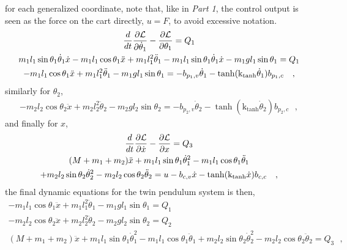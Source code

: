 for each generalized coordinate, note that, like in \textit{Part 1}, the control output is seen as the force on the cart directly, $u = F$, to avoid excessive notation.
\begin{gather}
\frac{d}{dt}  \frac{\partial \cal{L}}{\partial \dot{\theta}_1} - \frac{\partial \cal{L}}{\partial \theta_1}  = Q_1 \\
m_1 l_1 \sin \theta_1 \dot{\theta}_1 \dot{x} - m_1 l_1 \cos \theta_1 \ddot{x} + m_1 l_1^2 \ddot{\theta}_1 - m_1 l_1 \sin \theta_1 \dot{\theta}_1 \dot{x} - m_1 g l_1 \sin \theta_1 = Q_1  \\
- m_1 l_1 \cos \theta_1 \ddot{x} + m_1 l_1^2 \ddot{\theta}_1 - m_1 g l_1 \sin \theta_1 = -b_{p_1,v} \dot{\theta}_1 - \tanh(\text{k}_\text{tanh}\dot{\theta}_1) b_{p_1,c}  \ \ \ ,
\label{eq:theta1Dynamics}
\end{gather}
similarly for $\theta_2$,
\begin{gather}
- m_2 l_2 \cos \theta_2 \ddot{x} + m_2 l_2^2 \ddot{\theta}_2 - m_2 g l_2 \sin \theta_2 = -b_{p_2,v} \dot{\theta}_2 - \tanh(\text{k}_\text{tanh}\dot{\theta}_2) b_{p_2,c}  \ \ \ ,
\label{eq:theta2Dynamics}
\end{gather}
and finally for $x$,
\begin{gather}
\frac{d}{dt}  \frac{\partial \cal{L}}{\partial \dot{x}} - \frac{\partial \cal{L}}{\partial x}  = Q_3 \\
(M + m_1 + m_2) \ddot{x} + m_1 l_1 \sin \theta_1 \dot{\theta}_1^2 - m_1 l_1 \cos \theta_1 \ddot{\theta}_1 \\
+ m_2 l_2 \sin \theta_2 \dot{\theta}_2^2 - m_2 l_2 \cos \theta_2 \ddot{\theta}_2 = u - b_{c,v} \dot{x} - \tanh(\text{k}_\text{tanh}\dot{x}) b_{c,c}  \ \ \ ,
\label{eq:xDynamics}
\end{gather}
the final dynamic equations for the twin pendulum system is then,
%
\begingroup\makeatletter\def\f@size{10}\check@mathfonts
\def\maketag@@@#1{\hbox{\m@th\normalsize\normalfont#1}}%
\begin{gather}
- m_1 l_1 \cos \theta_1 \ddot{x} + m_1 l_1^2 \ddot{\theta}_1 - m_1 g l_1 \sin \theta_1 = Q_1 
\label{eq:theta1Dynamics1} \\
- m_2 l_2 \cos \theta_2 \ddot{x} + m_2 l_2^2 \ddot{\theta}_2 - m_2 g l_2 \sin \theta_2 = Q_2
\label{eq:theta2Dynamics1} \\
(M + m_1 + m_2) \ddot{x} + m_1 l_1 \sin \theta_1 \dot{\theta}_1^2 - m_1 l_1 \cos \theta_1 \ddot{\theta}_1 + m_2 l_2 \sin \theta_2 \dot{\theta}_2^2 - m_2 l_2 \cos \theta_2 \ddot{\theta}_2 = Q_3  \ \ \ , 
\label{eq:xDynamics1} \\ \nonumber
\end{gather}\endgroup \vspace{-36pt}
